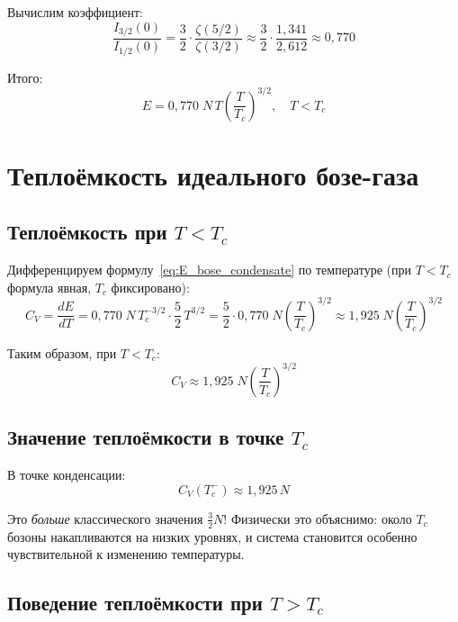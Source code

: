 \documentclass[../general/general]{subfiles}
\begin{document}
Вычислим коэффициент:
\begin{equation}
    \frac{I_{3/2}(0)}{I_{1/2}(0)} = \frac{3}{2}\cdot\frac{\zeta(5/2)}{\zeta(3/2)} \approx \frac{3}{2}\cdot\frac{1{,}341}{2{,}612} \approx 0{,}770
\end{equation}

Итого:
\begin{equation}
    \boxed{E = 0{,}770\;N\,T\left(\frac{T}{T_c}\right)^{3/2}, \quad T < T_c}
    \label{eq:E_bose_condensate}
\end{equation}



\section{Теплоёмкость идеального бозе-газа}

\subsection{Теплоёмкость при $T < T_c$}

Дифференцируем формулу~\eqref{eq:E_bose_condensate} по температуре (при $T < T_c$ формула явная, $T_c$ фиксировано):
\begin{equation}
    C_V = \frac{dE}{dT} = 0{,}770\;N\,T_c^{-3/2}\cdot\frac{5}{2}\,T^{3/2} = \frac{5}{2}\cdot 0{,}770\;N\left(\frac{T}{T_c}\right)^{3/2} \approx 1{,}925\;N\left(\frac{T}{T_c}\right)^{3/2}
\end{equation}

Таким образом, при $T < T_c$:
\begin{equation}
    C_V \approx 1{,}925\;N\left(\frac{T}{T_c}\right)^{3/2}
\end{equation}

\subsection{Значение теплоёмкости в точке $T_c$}

В точке конденсации:
\begin{equation}
    C_V(T_c^-) \approx 1{,}925\,N
\end{equation}

Это \emph{больше} классического значения $\frac{3}{2}N$! Физически это объяснимо: около $T_c$ бозоны накапливаются на низких уровнях, и система становится особенно чувствительной к изменению температуры.

\subsection{Поведение теплоёмкости при $T > T_c$}
\end{document}
